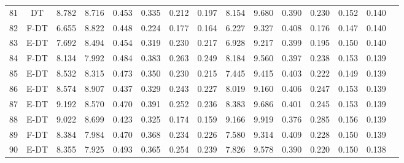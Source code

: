 \begin{longtable}{@{\hskip3pt}c@{\hskip3pt}c@{\hskip3pt}c@{\hskip3pt}c@{\hskip3pt}c@{\hskip3pt}c@{\hskip3pt}c@{\hskip3pt}c@{\hskip3pt}c@{\hskip3pt}c@{\hskip3pt}c@{\hskip3pt}c@{\hskip3pt}c@{\hskip3pt}c@{\hskip3pt}c}
         81 &             DT &             8.782 &       8.716 &         0.453 &       0.335 &       0.212 &        0.197 &               8.154 &       9.680 &         0.390 &       0.230 &       0.152 &        0.140 \\
         82 &           F-DT &             6.655 &       8.822 &         0.448 &       0.224 &       0.177 &        0.164 &               6.227 &       9.327 &         0.408 &       0.176 &       0.147 &        0.140 \\
         83 &           E-DT &             7.692 &       8.494 &         0.454 &       0.319 &       0.230 &        0.217 &               6.928 &       9.217 &         0.399 &       0.195 &       0.150 &        0.140 \\
         84 &           F-DT &             8.134 &       7.992 &         0.484 &       0.383 &       0.263 &        0.249 &               8.184 &       9.560 &         0.397 &       0.238 &       0.153 &        0.139 \\
         85 &           E-DT &             8.532 &       8.315 &         0.473 &       0.350 &       0.230 &        0.215 &               7.445 &       9.415 &         0.403 &       0.222 &       0.149 &        0.139 \\
         86 &           E-DT &             8.574 &       8.907 &         0.437 &       0.329 &       0.243 &        0.227 &               8.019 &       9.160 &         0.406 &       0.247 &       0.153 &        0.139 \\
         87 &           E-DT &             9.192 &       8.570 &         0.470 &       0.391 &       0.252 &        0.236 &               8.383 &       9.686 &         0.401 &       0.245 &       0.153 &        0.139 \\
         88 &           E-DT &             9.022 &       8.699 &         0.423 &       0.325 &       0.174 &        0.159 &               9.166 &       9.919 &         0.376 &       0.285 &       0.156 &        0.139 \\
         89 &           F-DT &             8.384 &       7.984 &         0.470 &       0.368 &       0.234 &        0.226 &               7.580 &       9.314 &         0.409 &       0.228 &       0.150 &        0.139 \\
         90 &           E-DT &             8.355 &       7.925 &         0.493 &       0.365 &       0.254 &        0.239 &               7.826 &       9.578 &         0.390 &       0.220 &       0.150 &        0.138 \\

\end{longtable}
